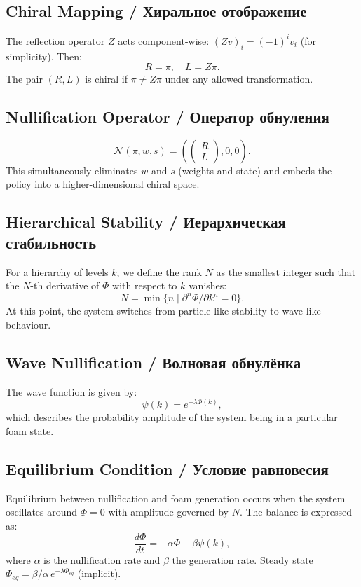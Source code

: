 \documentclass[12pt,a4paper]{article}
\begin{document}
\subsection{Chiral Mapping / Хиральное отображение}
The reflection operator $Z$ acts component-wise: $(Z v)_i = (-1)^i v_i$ (for simplicity). Then:
\begin{equation}
R = \pi, \quad L = Z\pi.
\end{equation}
The pair $(R, L)$ is chiral if $\pi \neq Z\pi$ under any allowed transformation.

\subsection{Nullification Operator / Оператор обнуления}
\begin{equation}
\mathcal{N}(\pi, w, s) = \left( \begin{pmatrix} R \\ L \end{pmatrix}, 0, 0 \right).
\end{equation}
This simultaneously eliminates $w$ and $s$ (weights and state) and embeds the policy into a higher-dimensional chiral space.

\subsection{Hierarchical Stability / Иерархическая стабильность}
For a hierarchy of levels $k$, we define the rank $N$ as the smallest integer such that the $N$-th derivative of $\Phi$ with respect to $k$ vanishes:
\begin{equation}
N = \min\{ n \mid \partial^n \Phi / \partial k^n = 0 \}.
\end{equation}
At this point, the system switches from particle-like stability to wave-like behaviour.

\subsection{Wave Nullification / Волновая обнулёнка}
The wave function is given by:
\begin{equation}
\psi(k) = e^{-\lambda \Phi(k)},
\end{equation}
which describes the probability amplitude of the system being in a particular foam state.

\subsection{Equilibrium Condition / Условие равновесия}
Equilibrium between nullification and foam generation occurs when the system oscillates around $\Phi=0$ with amplitude governed by $N$. The balance is expressed as:
\begin{equation}
\frac{d\Phi}{dt} = -\alpha \Phi + \beta \psi(k),
\end{equation}
where $\alpha$ is the nullification rate and $\beta$ the generation rate. Steady state $\Phi_{eq} = \beta/\alpha \, e^{-\lambda \Phi_{eq}}$ (implicit).
\end{document}
